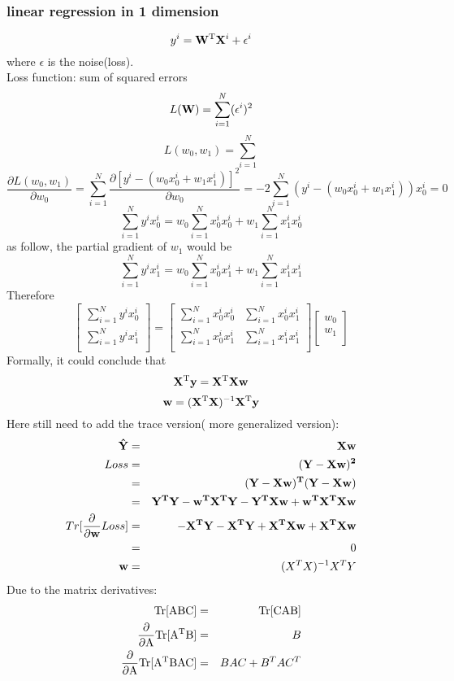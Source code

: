 \documentclass[12pt,a4paper]{article}
\begin{document}
\subsubsection*{linear regression in 1 dimension}
$$
y^i = {\bf W}^{\rm T}{\bf X}^i+\epsilon^i
$$
where $\epsilon$ is the noise(loss).\\
Loss function: sum of squared errors
$$
L({\bf W}) = \sum_{i=1}^{N}(\epsilon^i)
^2$$
$$
L(w_0,w_1) = \sum_{i=1}^{N}
$$
$$
\frac{\partial L(w_0,w_1)}{\partial w_0} = \sum_{i=1}^{N} \frac{\partial[y^i-(w_0x_0^i+w_1x_1^i)]^2}{\partial w_0} = -2\sum_{i=1}^{N}(y^i-(w_0x_0^i+w_1x_1^i))x_0^i = 0
$$
$$
\sum_{i=1}^{N}y^ix^i_0 = w_0\sum_{i=1}^{N}x_0^ix_0^i+w_1\sum_{i=1}^{N}x_1^ix_0^i
$$
as follow, the partial gradient of $w_1$ would be 
$$
\sum_{i=1}^{N}y^ix^i_1 = w_0\sum_{i=1}^{N}x_0^ix_1^i+w_1\sum_{i=1}^{N}x_1^ix_1^i
$$
Therefore
\begin{equation}
\left[
\begin{matrix}
\sum_{i=1}^{N}y^ix_0^i \\
\sum_{i=1}^{N}y^ix_1^i \\
\end{matrix}
\right]=
\left[
\begin{matrix}
\sum_{i=1}^{N}x^i_0x_0^i & \sum_{i=1}^{N}x_0^ix_1^i \\
\sum_{i=1}^{N}x_0^ix_1^i & \sum_{i=1}^{N}x_1^ix_1^i \\
\end{matrix}
\right]
\left[
\begin{matrix}
w_0 \\
w_1 \\
\end{matrix}
\right]
\end{equation}
Formally, it could conclude that
$$
{\bf X}^{\rm T}{\bf y} = {\bf X}^{\rm T}{\bf X}{\bf w}
$$
$$
{\bf w} = ({\bf X}^{\rm T}{\bf X})^{-1}{\bf X}^{\rm T}{\bf y}
$$
Here still need to add the trace version( more generalized version):
\begin{eqnarray*}
\bf \hat{Y} &=& \bf Xw \\
Loss &=& (\bf Y-Xw)^2\\
 &=& \bf (Y-Xw)^T(Y-Xw)\\
 &=& \bf Y^TY-w^TX^TY-Y^TXw+w^TX^TXw\\
Tr[\frac{\partial}{\partial{\bf w}} Loss] &=& \bf -X^TY-X^TY+X^TXw+X^TXw \\
&=& 0 \\
\bf w&=& (X^TX)^{-1}X^TY
\end{eqnarray*}
Due to the matrix derivatives:
\begin{eqnarray*}
\rm Tr[ABC]&=& \rm Tr[CAB]\\
\rm \frac{\partial}{\partial A}Tr[A^TB] &=& B\\
\rm \frac{\partial}{\partial A}Tr[A^TBAC] &=& BAC+B^TAC^T
\end{eqnarray*}
\end{document}
